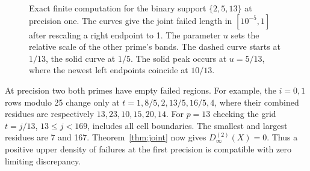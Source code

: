 \documentclass[11pt]{article}
\begin{document}
\begin{figure}[htbp]
\centering
{}
\caption{Exact finite computation for the binary support \(\{2,5,13\}\) at precision one. The curves give the joint failed length in \([10^{-5},1]\) after rescaling a right endpoint to 1. The parameter \(u\) sets the relative scale of the other prime\textquoteright s bands. The dashed curve starts at \(1/13\), the solid curve at \(1/5\). The solid peak occurs at \(u=5/13\), where the newest left endpoints coincide at \(10/13\).}\label{fig:curves}
\end{figure}

At precision two both primes have empty failed regions. For example, the \(i=0,1\) rows modulo 25 change only at \(t=1,8/5,2,13/5,16/5,4\), where their combined residues are respectively \(13,23,10,15,20,14\). For \(p=13\) checking the grid \(t=j/13\), \(13\le j<169\), includes all cell boundaries. The smallest and largest residues are 7 and 167. Theorem~\ref{thm:joint} now gives \(D_\infty^{(2)}(X)=0\). Thus a positive upper density of failures at the first precision is compatible with zero limiting discrepancy.
\end{document}
